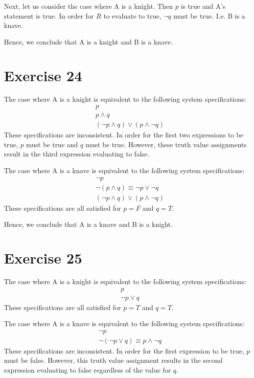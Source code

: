 \documentclass{article}
\begin{document}
Next, let us consider the case where A is a knight. Then $p$ is true and A's statement is true.  In order for $R$ to evaluate to true, $\neg q$ must be true. I.e. B is a knave.

Hence, we conclude that A is a knight and B is a knave.

\pagebreak

\section{Exercise 24}
The case where A is a knight is equivalent to the following system specifications:
\begin{align*}
	 & p                                      \\
	 & p \land q                              \\
	 & (\neg p \land q) \lor (p \land \neg q)
\end{align*}
These specifications are inconsistent.  In order for the first two expressions to be true, $p$ must be true and $q$ must be true. However, these truth value assignments result in the third expression evaluating to false.

The case where A is a knave is equivalent to the following system specifications:
\begin{align*}
	 & \neg p                                     \\
	 & \neg (p \land q) \equiv \neg p \lor \neg q \\
	 & (\neg p \land q) \lor (p \land \neg q)
\end{align*}
These specifications are all satisfied for $p = F$ and $q = T$.

Hence, we conclude that A is a knave and B is a knight.

\pagebreak

\section{Exercise 25}
The case where A is a knight is equivalent to the following system specifications:
\begin{align*}
	 & p             \\
	 & \neg p \lor q
\end{align*}
These specifications are all satisfied for $p = T$ and $q = T$.

The case where A is a knave is equivalent to the following system specifications:
\begin{align*}
	 & \neg p                                     \\
	 & \neg (\neg p \lor q) \equiv p \land \neg q
\end{align*}
These specifications are inconsistent. In order for the first expression to be true, $p$ must be false.  However, this truth value assignment results in the second expression evaluating to false regardless of the value for $q$.
\end{document}
